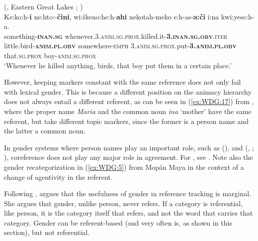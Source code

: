 \documentclass[output=collectionpaper]{langsci/langscibook}
\begin{document}
\ea\label{ex:WDG:16}
 (, Eastern Great Lakes ; \citealt[380]{Thomason2003})\\
\gll Ke:ko:h-\textbf{i}	ne:hto:-\textbf{čini}, wi:škeno:he:h-\textbf{ahi} nekotah-meko e:h-as-\textbf{a:či}	i:na	kwi:yese:h-a.\\
something-\textbf{\textsc{inan.sg}}	whenever.3.\textsc{anim.sg.prox}.killed.it-\textbf{3.\textsc{inan.sg.obv}}.\textsc{iter} little.bird-\textbf{\textsc{anim.pl.obv}} 	somewhere-\textsc{emph} 3.\textsc{anim.sg.prox}.put-\textbf{3.\textsc{anim.pl.obv}}	that.\textsc{sg.prox}	boy-\textsc{anim.sg.prox}\\
\glt `Whenever he killed anything, birds, that boy put them in a certain place.'\\
\z

However, keeping markers constant with the same reference does not only fail with lexical gender. This is because a different position on the animacy hierarchy does not always entail a different referent, as can be seen in (\ref{ex:WDG:17}) from , where the proper name \textit{Maria} and the common noun \textit{ina} `mother' have the same referent, but take different topic markers, since the former is a person name and the latter a common noun.

%

In gender systems where person names play an important role, such as  (),  and  (, ; \citealt{Mellow2013}), coreference does not play any major role in agreement. For , see . Note also the gender recategorization in (\ref{ex:WDG:5}) from Mopán Maya in the context of a change of agentivity in the referent.

Following \cite[334--360]{Kibrik2011},  argues that the usefulness of gender in reference tracking is marginal. She argues that gender, unlike person, never refers. If a category is referential, like person, it is the category itself that refers, and not the word that carries that category. Gender can be referent-based (and very often is, as shown in this section), but not referential.
\end{document}
